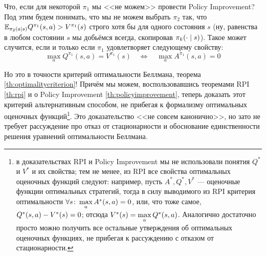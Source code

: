Что, если для некоторой $\pi_1$ мы <<не можем>> провести Policy Improvement? Под этим будем понимать, что мы не можем выбрать $\pi_{2}$ так, что $\E_{\pi_{2}(a \mid s)} Q^{\pi_{1}}(s, a) \HM> V^{\pi_{1}}(s)$ строго хотя бы для одного состояния $s$ (ну, равенства в любом состоянии $s$ мы добьёмся всегда, скопировав $\pi_k(\cdot \HM\mid s)$). Такое может случится, если и только если $\pi_1$ удовлетворяет следующему свойству:
$$\max_a Q^{\pi_{1}}(s, a) = V^{\pi_{1}}(s) \quad \Leftrightarrow \quad \max\limits_a A^{\pi_1}(s, a) = 0$$

Но это в точности критерий оптимальности Беллмана, теорема \ref{th:optimalitycriterion}! Причём мы можем, воспользовавшись теоремами RPI \ref{th:rpi} и о Policy Improvement \ref{th:policyimprovement}, теперь доказать этот критерий альтернативным способом, не прибегая к формализму оптимальных оценочных функций\footnote{в доказательствах RPI и Policy Improvement мы не использовали понятия $Q^*$ и $V^*$ и их свойства; тем не менее, из RPI все свойства оптимальных оценочных функций следуют: например, пусть $A^*, Q^*, V^*$ --- оценочные функции оптимальных стратегий, тогда в силу выводимого из RPI критерия оптимальности $\forall s \colon \max\limits_a A^*(s, a) \HM= 0$, или, что тоже самое, $Q^*(s, a) \HM- V^*(s) \HM= 0$; отсюда $V^*(s) \HM= \max\limits_a Q^*(s, a)$. Аналогично достаточно просто можно получить все остальные утверждения об оптимальных оценочных функциях, не прибегая к рассуждению с отказом от стационарности.}. Это доказательство <<не совсем канонично>>, но зато не требует рассуждение про отказ от стационарности и обоснование единственности решения уравнений оптимальности Беллмана.

